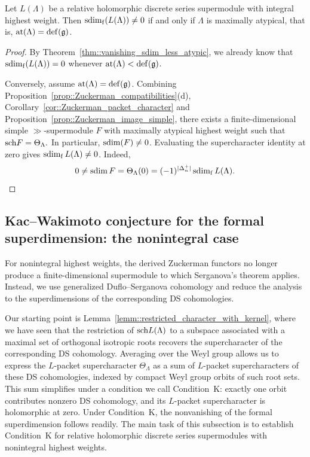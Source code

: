 \begin{theorem}\label{thm::formal_KW_integral}
Let $L(\Lambda)$ be a relative holomorphic discrete series supermodule with integral highest weight. Then $\operatorname{sdim}_{\mathrm f}(L(\Lambda))\neq0$ if and only if $\Lambda$ is maximally atypical, that is, ${\operatorname{at}}(\Lambda)={\mathrm{def}}({\mathfrak{g}})$.
\end{theorem}

\begin{proof}
By Theorem~\ref{thm::vanishing_sdim_less_atypic}, we already know that $\operatorname{sdim}_{\mathrm f}(L(\Lambda))=0$ whenever ${\operatorname{at}}(\Lambda)<{\mathrm{def}}({\mathfrak{g}})$.

Conversely, assume ${\operatorname{at}}(\Lambda)={\mathrm{def}}({\mathfrak{g}})$. Combining Proposition~\ref{prop::Zuckerman_compatibilities}(d), Corollary~\ref{cor::Zuckerman_packet_character} and Proposition~\ref{prop::Zuckerman_image_simple}, there exists a finite-dimensional simple $\gg$-supermodule $F$ with maximally atypical highest weight such that
$
{\operatorname{sch}} F=\Theta_\Lambda.
$
In particular, $\operatorname{sdim}(F)\neq 0$. Evaluating the supercharacter identity at zero gives $\operatorname{sdim}_{\mathrm f} L(\Lambda)\neq 0$. Indeed,
\[
0\neq\operatorname{sdim} F
=\Theta_\Lambda(0)
=(-1)^{|\Delta_n^+|}\operatorname{sdim}_{\mathrm f} L(\Lambda).\qedhere
\]
\end{proof}


\subsection{Kac--Wakimoto conjecture for the formal superdimension: the nonintegral case}\label{subsec::KW_conjecture_nonintegral_case}
\noindent
For nonintegral highest weights, the derived Zuckerman functors no longer produce a finite-dimensional
supermodule to which Serganova's theorem applies. Instead, we use
generalized Duflo--Serganova cohomology and reduce the analysis to the superdimensions of the corresponding DS cohomologies.

Our starting point is Lemma~\ref{lemm::restricted_character_with_kernel}, where we have seen that the restriction of ${\operatorname{sch}} L(\Lambda)$ to a subspace associated with a maximal set of
orthogonal isotropic roots recovers the supercharacter of the corresponding
DS cohomology. Averaging over the Weyl group allows us to express the $L$-packet
supercharacter $\Theta_\Lambda$ as a sum of $L$-packet supercharacters of
these DS cohomologies, indexed by compact Weyl group orbits of such root sets. 
This sum simplifies under a condition we call Condition~K: exactly one orbit
contributes nonzero DS cohomology, and its $L$-packet supercharacter is holomorphic
at zero. Under Condition~K, the nonvanishing of the formal superdimension follows
readily. The main task of this subsection is to establish Condition~K for
relative holomorphic discrete series supermodules with nonintegral highest weights.

